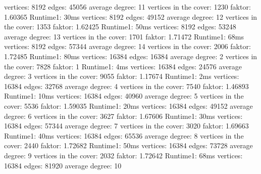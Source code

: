 \documentclass[12pt,onecolumn, notitlepage]{scrartcl}
\begin{document}
\newline vertices: 8192 edges: 45056 average degree: 11 
\newline vertices in the cover: 1230 faktor: 1.60365 Runtime1: 30ms
\newline vertices: 8192 edges: 49152 average degree: 12 
\newline vertices in the cover: 1353 faktor: 1.62425 Runtime1: 50ms
\newline vertices: 8192 edges: 53248 average degree: 13 
\newline vertices in the cover: 1701 faktor: 1.71472 Runtime1: 68ms
\newline vertices: 8192 edges: 57344 average degree: 14 
\newline vertices in the cover: 2006 faktor: 1.72485 Runtime1: 80ms \newline 
\newline vertices: 16384 edges: 16384 average degree: 2 
\newline vertices in the cover: 7828 faktor: 1 Runtime1: 4ms
\newline vertices: 16384 edges: 24576 average degree: 3 
\newline vertices in the cover: 9055 faktor: 1.17674 Runtime1: 2ms
\newline vertices: 16384 edges: 32768 average degree: 4 
\newline vertices in the cover: 7540 faktor: 1.46893 Runtime1: 10ms
\newline vertices: 16384 edges: 40960 average degree: 5 
\newline vertices in the cover: 5536 faktor: 1.59035 Runtime1: 20ms
\newline vertices: 16384 edges: 49152 average degree: 6 
\newline vertices in the cover: 3627 faktor: 1.67606 Runtime1: 30ms
\newline vertices: 16384 edges: 57344 average degree: 7 
\newline vertices in the cover: 3020 faktor: 1.69663 Runtime1: 40ms
\newline vertices: 16384 edges: 65536 average degree: 8 
\newline vertices in the cover: 2440 faktor: 1.72682 Runtime1: 50ms
\newline vertices: 16384 edges: 73728 average degree: 9 
\newline vertices in the cover: 2032 faktor: 1.72642 Runtime1: 68ms
\newline vertices: 16384 edges: 81920 average degree: 10 
\end{document}
